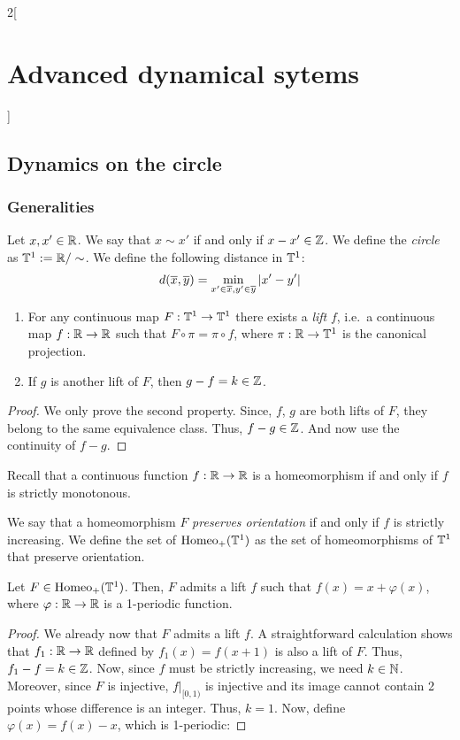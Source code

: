 \documentclass[../../../main_math.tex]{subfiles}
\begin{document}
\begin{multicols}{2}[\section{Advanced dynamical sytems}]
  \subsection{Dynamics on the circle}
  \subsubsection{Generalities}
  \begin{definition}
    Let $x,x'\in\mathbb{R}$. We say that $x\sim x'$ if and only if $x-x'\in\mathbb{Z}$. We define the \emph{circle} as $\TT^1:=\quot{\RR}{\sim}$. We define the following distance in $\mathbb{T}^1$:
    $$
      d(\overline{x},\overline{y})=\min_{x'\in\overline{x},y'\in\overline{y}}\abs{x'-y'}
    $$
  \end{definition}
  \begin{proposition}\hfill
    \begin{enumerate}
      \item For any continuous map $F:\mathbb{T}^1\to \mathbb{T}^1$ there exists a \emph{lift} $f$, i.e.\ a continuous map $f:\mathbb{R}\to \mathbb{R}$ such that $F\circ \pi=\pi\circ f$, where $\pi:\mathbb{R}\to\mathbb{T}^1$ is the canonical projection.
      \item If $g$ is another lift of $F$, then $g-f=k\in\mathbb{Z}$.
    \end{enumerate}
  \end{proposition}
  \begin{proof}
    We only prove the second property. Since, $f$, $g$ are both lifts of $F$, they belong to the same equivalence class. Thus, $f-g\in\mathbb{Z}$. And now use the continuity of $f-g$.
  \end{proof}
  \begin{remark}
    Recall that a continuous function $f:\mathbb{R}\to\mathbb{R}$ is a homeomorphism if and only if $f$ is strictly monotonous.
  \end{remark}
  \begin{definition}
    We say that a homeomorphism $F$ \emph{preserves orientation} if and only if $f$ is strictly increasing. We define the set of $\mathrm{Homeo}_+(\mathbb{T}^1)$ as the set of homeomorphisms of $\mathbb{T}^1$ that preserve orientation.
  \end{definition}
  \begin{proposition}
    Let $F\in\mathrm{Homeo}_+(\mathbb{T}^1)$. Then, $F$ admits a lift $f$ such that $f(x)=x+\varphi(x)$, where $\varphi:\mathbb{R}\to\mathbb{R}$ is a 1-periodic function.
  \end{proposition}
  \begin{proof}
    We already now that $F$ admits a lift $f$. A straightforward calculation shows that $f_1:\mathbb{R}\to\mathbb{R}$ defined by $f_1(x)=f(x+1)$ is also a lift of $F$. Thus, $f_1-f=k\in \mathbb{Z}$. Now, since $f$ must be strictly increasing, we need $k\in \mathbb{N}$. Moreover, since $F$ is injective, $f|_{[0,1)}$ is injective and its image cannot contain 2 points whose difference is an integer. Thus, $k=1$. Now, define $\varphi(x)=f(x)-x$, which is 1-periodic:

\end{proof}
\end{multicols}
\end{document}
